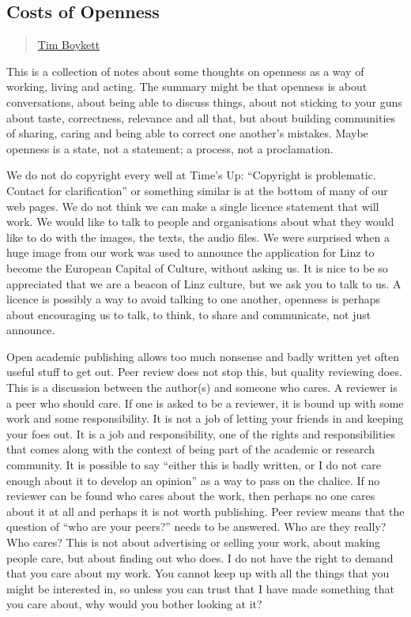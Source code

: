 \subsection{Costs of Openness}\label{costs-of-openness}

\begin{quote}
\href{../appendix/attributions.html\#tim-boykett}{Tim Boykett}
\end{quote}

This is a collection of notes about some thoughts on openness as a way
of working, living and acting. The summary might be that openness is
about conversations, about being able to discuss things, about not
sticking to your guns about taste, correctness, relevance and all that,
but about building communities of sharing, caring and being able to
correct one another's mistakes. Maybe openness is a state, not a
statement; a process, not a proclamation.

We do not do copyright every well at Time's Up: ``Copyright is
problematic. Contact for clarification'' or something similar is at the
bottom of many of our web pages. We do not think we can make a single
licence statement that will work. We would like to talk to people and
organisations about what they would like to do with the images, the
texts, the audio files. We were surprised when a huge image from our
work was used to announce the application for Linz to become the
European Capital of Culture, without asking us. It is nice to be so
appreciated that we are a beacon of Linz culture, but we ask you to talk
to us. A licence is possibly a way to avoid talking to one another,
openness is perhaps about encouraging us to talk, to think, to share and
communicate, not just announce.

Open academic publishing allows too much nonsense and badly written yet
often useful stuff to get out. Peer review does not stop this, but
quality reviewing does. This is a discussion between the author(s) and
someone who cares. A reviewer is a peer who should care. If one is asked
to be a reviewer, it is bound up with some work and some responsibility.
It is not a job of letting your friends in and keeping your foes out. It
is a job and responsibility, one of the rights and responsibilities that
comes along with the context of being part of the academic or research
community. It is possible to say ``either this is badly written, or I do
not care enough about it to develop an opinion'' as a way to pass on the
chalice. If no reviewer can be found who cares about the work, then
perhaps no one cares about it at all and perhaps it is not worth
publishing. Peer review means that the question of ``who are your
peers?'' needs to be answered. Who are they really? Who cares? This is
not about advertising or selling your work, about making people care,
but about finding out who does. I do not have the right to demand that
you care about my work. You cannot keep up with all the things that you
might be interested in, so unless you can trust that I have made
something that you care about, why would you bother looking at it?

